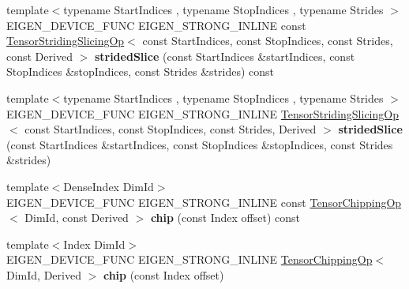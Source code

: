 \begin{DoxyCompactItemize}
\item 
\mbox{\label{class_eigen_1_1_tensor_base_a4b464fb077d13f81ff83b9989a27e639}} 
{\footnotesize template$<$typename Start\+Indices , typename Stop\+Indices , typename Strides $>$ }\\E\+I\+G\+E\+N\+\_\+\+D\+E\+V\+I\+C\+E\+\_\+\+F\+U\+NC E\+I\+G\+E\+N\+\_\+\+S\+T\+R\+O\+N\+G\+\_\+\+I\+N\+L\+I\+NE const \hyperlink{class_eigen_1_1_tensor_striding_slicing_op}{Tensor\+Striding\+Slicing\+Op}$<$ const Start\+Indices, const Stop\+Indices, const Strides, const Derived $>$ {\bfseries strided\+Slice} (const Start\+Indices \&start\+Indices, const Stop\+Indices \&stop\+Indices, const Strides \&strides) const
\item 
\mbox{\label{class_eigen_1_1_tensor_base_aaca6ee903e5ab0d5cd9097ef9953f5e3}} 
{\footnotesize template$<$typename Start\+Indices , typename Stop\+Indices , typename Strides $>$ }\\E\+I\+G\+E\+N\+\_\+\+D\+E\+V\+I\+C\+E\+\_\+\+F\+U\+NC E\+I\+G\+E\+N\+\_\+\+S\+T\+R\+O\+N\+G\+\_\+\+I\+N\+L\+I\+NE \hyperlink{class_eigen_1_1_tensor_striding_slicing_op}{Tensor\+Striding\+Slicing\+Op}$<$ const Start\+Indices, const Stop\+Indices, const Strides, Derived $>$ {\bfseries strided\+Slice} (const Start\+Indices \&start\+Indices, const Stop\+Indices \&stop\+Indices, const Strides \&strides)
\item 
\mbox{\label{class_eigen_1_1_tensor_base_acebda719199f45ed7e77db1730ae7a43}} 
{\footnotesize template$<$Dense\+Index Dim\+Id$>$ }\\E\+I\+G\+E\+N\+\_\+\+D\+E\+V\+I\+C\+E\+\_\+\+F\+U\+NC E\+I\+G\+E\+N\+\_\+\+S\+T\+R\+O\+N\+G\+\_\+\+I\+N\+L\+I\+NE const \hyperlink{class_eigen_1_1_tensor_chipping_op}{Tensor\+Chipping\+Op}$<$ Dim\+Id, const Derived $>$ {\bfseries chip} (const Index offset) const
\item 
\mbox{\label{class_eigen_1_1_tensor_base_a0016263c69b25dcfef7655b0a56f52ff}} 
{\footnotesize template$<$Index Dim\+Id$>$ }\\E\+I\+G\+E\+N\+\_\+\+D\+E\+V\+I\+C\+E\+\_\+\+F\+U\+NC E\+I\+G\+E\+N\+\_\+\+S\+T\+R\+O\+N\+G\+\_\+\+I\+N\+L\+I\+NE \hyperlink{class_eigen_1_1_tensor_chipping_op}{Tensor\+Chipping\+Op}$<$ Dim\+Id, Derived $>$ {\bfseries chip} (const Index offset)
\item 

\end{DoxyCompactItemize}
